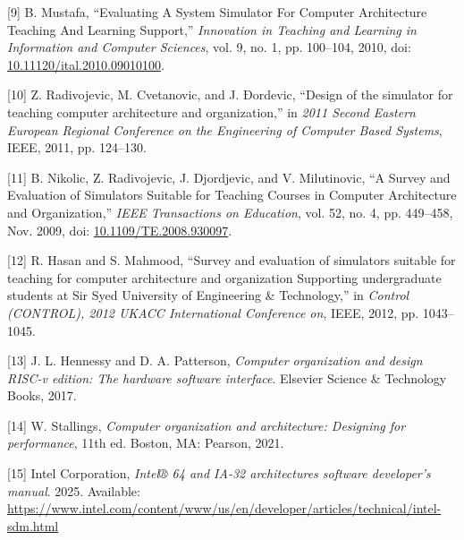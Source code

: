 \documentclass[12pt,oneside]{templates/unerthesis}
\newcommand{\CSLLeftMargin}[1]{#1} %
\newcommand{\CSLRightInline}[1]{#1} %
\newlength{\cslhangindent}
\newenvironment{CSLReferences}[2] %
 {\setlength{\parindent}{0pt}%
  \setlength{\leftskip}{#1 pt\relax}%
  \setlength{\parskip}{#2 pt\relax}%
  \everypar{\setlength{\hangindent}{\cslhangindent}}}
 {\par}
\begin{document}
\begin{CSLReferences}{0}{0}
\leavevmode{}%
\CSLLeftMargin{{[}9{]} }%
\CSLRightInline{B. Mustafa, {``Evaluating {A} {System} {Simulator} {For} {Computer} {Architecture} {Teaching} {And} {Learning} {Support},''} \emph{Innovation in Teaching and Learning in Information and Computer Sciences}, vol. 9, no. 1, pp. 100--104, 2010, doi: \href{https://doi.org/10.11120/ital.2010.09010100}{10.11120/ital.2010.09010100}.}

\leavevmode{}%
\CSLLeftMargin{{[}10{]} }%
\CSLRightInline{Z. Radivojevic, M. Cvetanovic, and J. Ðordevic, {``Design of the simulator for teaching computer architecture and organization,''} in \emph{2011 {Second} {Eastern} {European} {Regional} {Conference} on the {Engineering} of {Computer} {Based} {Systems}}, IEEE, 2011, pp. 124--130.}

\leavevmode{}%
\CSLLeftMargin{{[}11{]} }%
\CSLRightInline{B. Nikolic, Z. Radivojevic, J. Djordjevic, and V. Milutinovic, {``A {Survey} and {Evaluation} of {Simulators} {Suitable} for {Teaching} {Courses} in {Computer} {Architecture} and {Organization},''} \emph{IEEE Transactions on Education}, vol. 52, no. 4, pp. 449--458, Nov. 2009, doi: \href{https://doi.org/10.1109/TE.2008.930097}{10.1109/TE.2008.930097}.}

\leavevmode{}%
\CSLLeftMargin{{[}12{]} }%
\CSLRightInline{R. Hasan and S. Mahmood, {``Survey and evaluation of simulators suitable for teaching for computer architecture and organization {Supporting} undergraduate students at {Sir} {Syed} {University} of {Engineering} \& {Technology},''} in \emph{Control ({CONTROL}), 2012 {UKACC} {International} {Conference} on}, IEEE, 2012, pp. 1043--1045.}

\leavevmode{}%
\CSLLeftMargin{{[}13{]} }%
\CSLRightInline{J. L. Hennessy and D. A. Patterson, \emph{Computer organization and design RISC-v edition: The hardware software interface}. Elsevier Science \& Technology Books, 2017.}

\leavevmode{}%
\CSLLeftMargin{{[}14{]} }%
\CSLRightInline{W. Stallings, \emph{Computer organization and architecture: Designing for performance}, 11th ed. Boston, MA: Pearson, 2021.}

\leavevmode{}%
\CSLLeftMargin{{[}15{]} }%
\CSLRightInline{Intel Corporation, \emph{Intel® 64 and IA-32 architectures software developer's manual}. 2025. Available: \url{https://www.intel.com/content/www/us/en/developer/articles/technical/intel-sdm.html}}


\end{CSLReferences}
\end{document}
